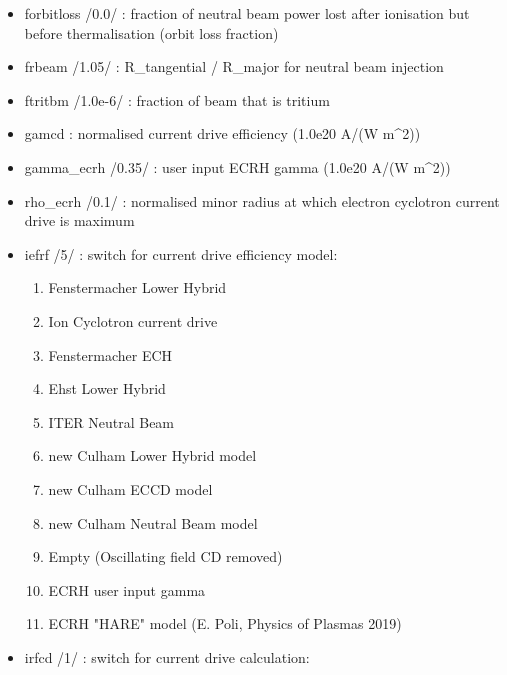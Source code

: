 \documentclass[]{article}
\providecommand{\tightlist}{%
  \setlength{\itemsep}{0pt}\setlength{\parskip}{0pt}}
\begin{document}
\begin{itemize}
\item
  forbitloss /0.0/ : fraction of neutral beam power lost after
  ionisation but before thermalisation (orbit loss fraction)
\item
  frbeam /1.05/ : R\_tangential / R\_major for neutral beam injection
\item
  ftritbm /1.0e-6/ : fraction of beam that is tritium
\item
  gamcd : normalised current drive efficiency (1.0e20 A/(W m\^{}2))
\item
  gamma\_ecrh /0.35/ : user input ECRH gamma (1.0e20 A/(W m\^{}2))
\item
  rho\_ecrh /0.1/ : normalised minor radius at which electron cyclotron
  current drive is maximum
\item
  iefrf /5/ : switch for current drive efficiency model:

  \begin{enumerate}
  \tightlist
  \item
    Fenstermacher Lower Hybrid
  \item
    Ion Cyclotron current drive
  \item
    Fenstermacher ECH
  \item
    Ehst Lower Hybrid
  \item
    ITER Neutral Beam
  \item
    new Culham Lower Hybrid model
  \item
    new Culham ECCD model
  \item
    new Culham Neutral Beam model
  \item
    Empty (Oscillating field CD removed)
  \item
    ECRH user input gamma
  \item
    ECRH "HARE" model (E. Poli, Physics of Plasmas 2019)
  \end{enumerate}
\item
  irfcd /1/ : switch for current drive calculation:


\end{itemize}
\end{document}
